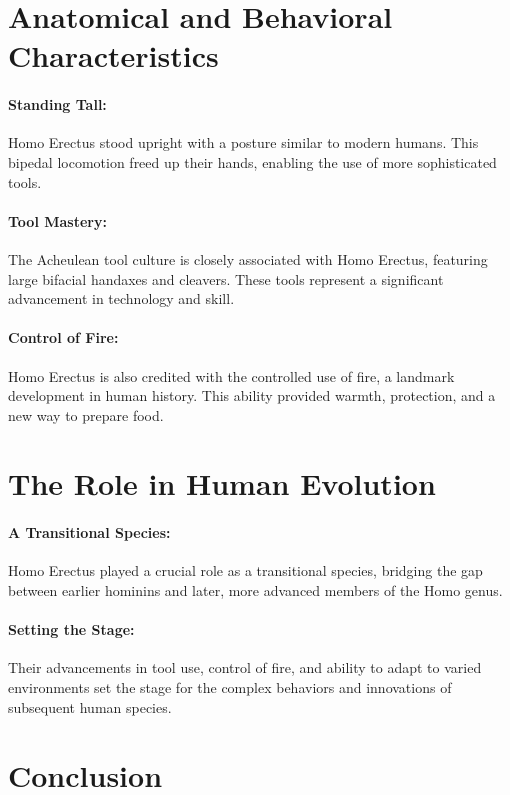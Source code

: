 \documentclass[a4paper,12pt]{book}
\begin{document}
\section*{Anatomical and Behavioral Characteristics}

\paragraph{Standing Tall:}
Homo Erectus stood upright with a posture similar to modern humans. This bipedal locomotion freed up their hands, enabling the use of more sophisticated tools.

\paragraph{Tool Mastery:}
The Acheulean tool culture is closely associated with Homo Erectus, featuring large bifacial handaxes and cleavers. These tools represent a significant advancement in technology and skill.

\paragraph{Control of Fire:}
Homo Erectus is also credited with the controlled use of fire, a landmark development in human history. This ability provided warmth, protection, and a new way to prepare food.

\section*{The Role in Human Evolution}

\paragraph{A Transitional Species:}
Homo Erectus played a crucial role as a transitional species, bridging the gap between earlier hominins and later, more advanced members of the Homo genus.

\paragraph{Setting the Stage:}
Their advancements in tool use, control of fire, and ability to adapt to varied environments set the stage for the complex behaviors and innovations of subsequent human species.

\section*{Conclusion}
\end{document}
